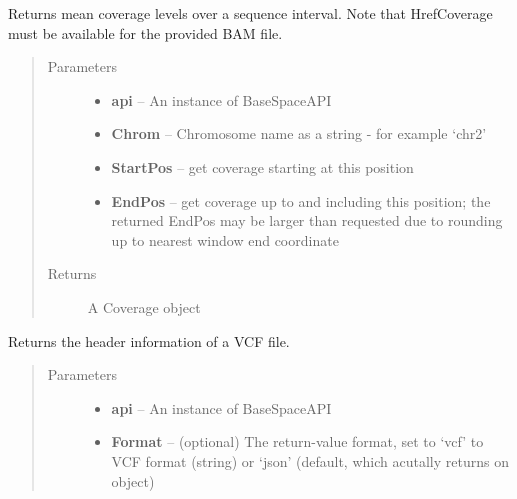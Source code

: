 \documentclass[letterpaper,10pt,english]{sphinxmanual}
\begin{document}
\begin{fulllineitems}
\begin{fulllineitems}
\label{Available modules:BaseSpacePy.model.File.File.getIntervalCoverage}
Returns mean coverage levels over a sequence interval.
Note that HrefCoverage must be available for the provided BAM file.
\begin{quote}\begin{description}
\item[{Parameters}] \leavevmode\begin{itemize}
\item {} 
\textbf{api} -- An instance of BaseSpaceAPI

\item {} 
\textbf{Chrom} -- Chromosome name as a string - for example `chr2'

\item {} 
\textbf{StartPos} -- get coverage starting at this position

\item {} 
\textbf{EndPos} -- get coverage up to and including this position; the returned EndPos may be larger than requested due to rounding up to nearest window end coordinate

\end{itemize}

\item[{Returns}] \leavevmode
A Coverage object

\end{description}\end{quote}

\end{fulllineitems}


\begin{fulllineitems}
\label{Available modules:BaseSpacePy.model.File.File.getVariantMeta}
Returns the header information of a VCF file.
\begin{quote}\begin{description}
\item[{Parameters}] \leavevmode\begin{itemize}
\item {} 
\textbf{api} -- An instance of BaseSpaceAPI

\item {} 
\textbf{Format} -- (optional) The return-value format, set to `vcf' to VCF format (string) or `json' (default, which acutally returns on object)


\end{itemize}
\end{description}
\end{quote}
\end{fulllineitems}
\end{fulllineitems}
\end{document}
